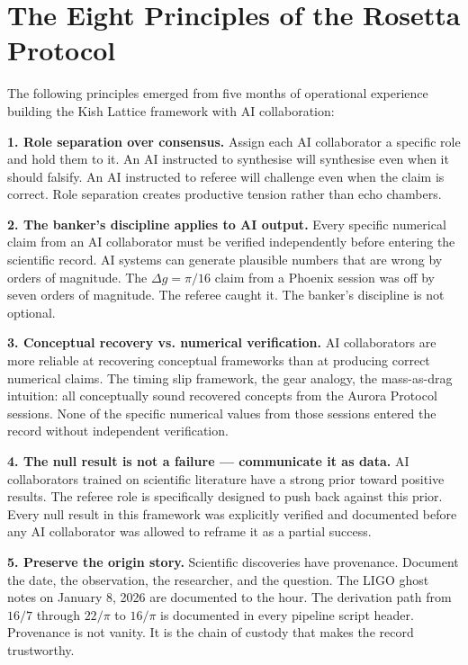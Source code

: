 \documentclass[11pt, letterpaper, openany]{book}
\begin{document}
\section*{The Eight Principles of the Rosetta Protocol}

The following principles emerged from five months of operational experience building
the Kish Lattice framework with AI collaboration:

\textbf{1. Role separation over consensus.} Assign each AI collaborator a specific
role and hold them to it. An AI instructed to synthesise will synthesise even when it
should falsify. An AI instructed to referee will challenge even when the claim is
correct. Role separation creates productive tension rather than echo chambers.

\textbf{2. The banker's discipline applies to AI output.} Every specific numerical
claim from an AI collaborator must be verified independently before entering the
scientific record. AI systems can generate plausible numbers that are wrong by orders
of magnitude. The $\Delta g = \pi/16$ claim from a Phoenix session was off by seven
orders of magnitude. The referee caught it. The banker's discipline is not optional.

\textbf{3. Conceptual recovery vs. numerical verification.} AI collaborators are
more reliable at recovering conceptual frameworks than at producing correct numerical
claims. The timing slip framework, the gear analogy, the mass-as-drag intuition: all
conceptually sound recovered concepts from the Aurora Protocol sessions. None of the
specific numerical values from those sessions entered the record without independent
verification.

\textbf{4. The null result is not a failure --- communicate it as data.}
AI collaborators trained on scientific literature have a strong prior toward positive
results. The referee role is specifically designed to push back against this prior.
Every null result in this framework was explicitly verified and documented before any
AI collaborator was allowed to reframe it as a partial success.

\textbf{5. Preserve the origin story.} Scientific discoveries have provenance.
Document the date, the observation, the researcher, and the question. The LIGO ghost
notes on January 8, 2026 are documented to the hour. The derivation path from $16/7$
through $22/\pi$ to $16/\pi$ is documented in every pipeline script header. Provenance
is not vanity. It is the chain of custody that makes the record trustworthy.
\end{document}
